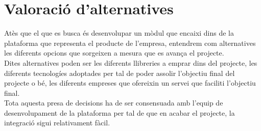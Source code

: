 \section{Valoració d'alternatives}
\label{sec:validacio}
Atès que el que es busca és desenvolupar un mòdul que encaixi dins de la plataforma que representa el producte de l'empresa, entendrem com alternatives les diferents opcions que sorgeixen a mesura que es avança el projecte.\\
\newline Dites alternatives poden ser les diferents llibreries a emprar dins del projecte, les diferents tecnologíes adoptades per tal de poder assolir l'objectiu final del projecte o bé, les diferents empreses que ofereixin un servei que faciliti l'objectiu final.\\
\newline Tota aquesta presa de decisions ha de ser consensuada amb l'equip de desenvolupament de la plataforma per tal de que en acabar el projecte, la integració sigui relativament fàcil.
